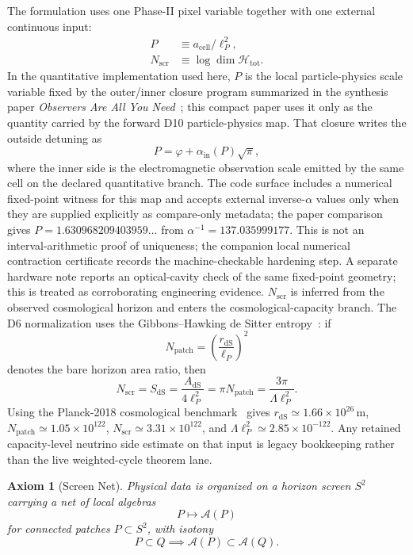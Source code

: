 \documentclass[11pt]{article}
\newtheorem{axiom}[theorem]{Axiom}
\begin{document}
The formulation uses one Phase-II pixel variable together with one external continuous input:
\begin{align}
P &\equiv a_{\mathrm{cell}}/\ell_P^2,\\
N_{\mathrm{scr}} &\equiv \log \dim \mathcal H_{\mathrm{tot}}.
\end{align}
In the quantitative implementation used here, \(P\) is the local particle-physics scale variable
fixed by the outer/inner closure program summarized in the synthesis paper
\emph{Observers Are All You Need}~\cite{ophsynthesis}; this compact paper uses it only as the
quantity carried by the forward D10 particle-physics map. That closure writes the outside
detuning as
\[
P=\varphi+\alpha_{\mathrm{in}}(P)\sqrt{\pi},
\]
where the inner side is the electromagnetic observation scale emitted by the same cell on the
declared quantitative branch. The code surface includes a numerical fixed-point witness
for this map and accepts external inverse-\(\alpha\) values only when they are supplied explicitly
as compare-only metadata; the paper comparison gives
\(P=1.630968209403959\ldots\) from \(\alpha^{-1}=137.035999177\). This is not an
interval-arithmetic proof of uniqueness; the companion local numerical contraction certificate
records the machine-checkable hardening step. A separate hardware note reports an
optical-cavity check of the same fixed-point geometry; this is treated as corroborating
engineering evidence. \(N_{\mathrm{scr}}\) is inferred from the observed
cosmological horizon and enters the cosmological-capacity branch. The D6 normalization uses the
Gibbons--Hawking de Sitter entropy~\cite{gibbonsHawking77}: if
\[
N_{\mathrm{patch}}=\left(\frac{r_{\mathrm{dS}}}{\ell_P}\right)^2
\]
denotes the bare horizon area ratio, then
\[
N_{\mathrm{scr}}=S_{\mathrm{dS}}=\frac{A_{\mathrm{dS}}}{4\ell_P^2}
=\pi N_{\mathrm{patch}}
=\frac{3\pi}{\Lambda\ell_P^2}.
\]
Using the Planck-2018 cosmological benchmark~\cite{planck18} gives
\(r_{\mathrm{dS}}\simeq1.66\times10^{26}\,\mathrm m\),
\(N_{\mathrm{patch}}\simeq1.05\times10^{122}\),
\(N_{\mathrm{scr}}\simeq3.31\times10^{122}\), and
\(\Lambda\ell_P^2\simeq2.85\times10^{-122}\). Any retained capacity-level
neutrino side estimate on that input is legacy bookkeeping rather than the live weighted-cycle
theorem lane.

\begin{axiom}[Screen Net]\label{ax:screen}
Physical data is organized on a horizon screen \(S^2\) carrying a net of local algebras
\[
P \longmapsto \mathcal A(P)
\]
for connected patches \(P\subset S^2\), with isotony
\[
P\subset Q \implies \mathcal A(P)\subset \mathcal A(Q).
\]
\end{axiom}
\end{document}
